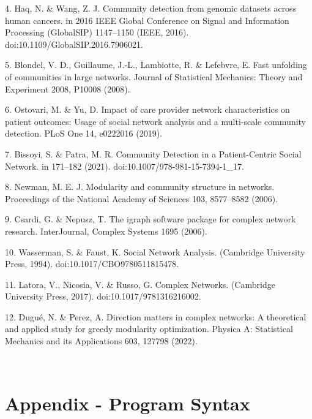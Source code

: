 4. Haq, N. \& Wang, Z. J. Community detection from genomic datasets
across human cancers. in 2016 IEEE Global Conference on Signal and
Information Processing (GlobalSIP) 1147--1150 (IEEE, 2016).
doi:10.1109/GlobalSIP.2016.7906021.

5. Blondel, V. D., Guillaume, J.-L., Lambiotte, R. \& Lefebvre, E. Fast
unfolding of communities in large networks. Journal of Statistical
Mechanics: Theory and Experiment 2008, P10008 (2008).

6. Ostovari, M. \& Yu, D. Impact of care provider network
characteristics on patient outcomes: Usage of social network analysis
and a multi-scale community detection. PLoS One 14, e0222016 (2019).

7. Bissoyi, S. \& Patra, M. R. Community Detection in a Patient-Centric
Social Network. in 171--182 (2021). doi:10.1007/978-981-15-7394-1\_17.

8. Newman, M. E. J. Modularity and community structure in networks.
Proceedings of the National Academy of Sciences 103, 8577--8582 (2006).

9. Csardi, G. \& Nepusz, T. The igraph software package for complex
network research. InterJournal, Complex Systems 1695 (2006).

10. Wasserman, S. \& Faust, K. Social Network Analysis. (Cambridge
University Press, 1994). doi:10.1017/CBO9780511815478.

11. Latora, V., Nicosia, V. \& Russo, G. Complex Networks. (Cambridge
University Press, 2017). doi:10.1017/9781316216002.

12. Dugué, N. \& Perez, A. Direction matters in complex networks: A
theoretical and applied study for greedy modularity optimization.
Physica A: Statistical Mechanics and its Applications 603, 127798
(2022).

~

\section{Appendix - Program Syntax}\label{appendix---program-syntax}

